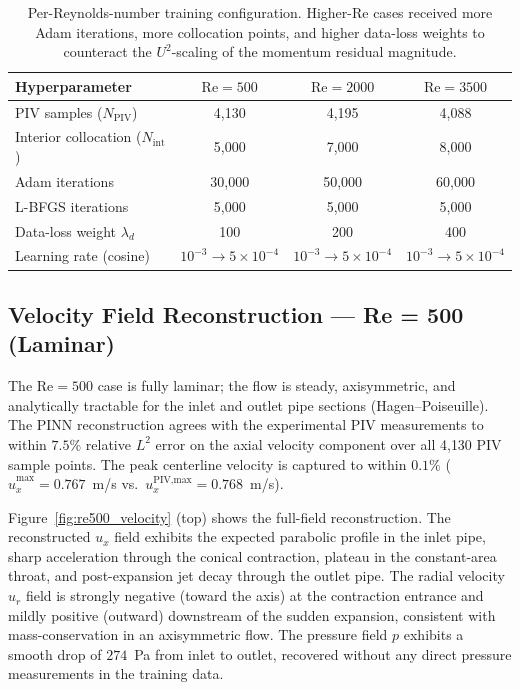 \documentclass[12pt,a4paper]{article}
\newcommand{\Reyn}{\mathrm{Re}}    %
\begin{document}
\begin{table}[H]
  \centering
  \caption{Per-Reynolds-number training configuration. Higher-$\Reyn$
  cases received more Adam iterations, more collocation points, and
  higher data-loss weights to counteract the $U^2$-scaling of the
  momentum residual magnitude.}
  \label{tab:hyperparams}
  \begin{tabular}{lccc}
    \toprule
    Hyperparameter & $\Reyn = 500$ & $\Reyn = 2000$ & $\Reyn = 3500$ \\
    \midrule
    PIV samples ($N_{\text{PIV}}$)       & 4,130  & 4,195  & 4,088  \\
    Interior collocation ($N_{\text{int}}$) & 5,000 & 7,000 & 8,000 \\
    Adam iterations                      & 30,000 & 50,000 & 60,000 \\
    L-BFGS iterations                    & 5,000  & 5,000  & 5,000  \\
    Data-loss weight $\lambda_d$         & 100    & 200    & 400    \\
    Learning rate (cosine)               & $10^{-3} \to 5\!\times\!10^{-4}$
                                         & $10^{-3} \to 5\!\times\!10^{-4}$
                                         & $10^{-3} \to 5\!\times\!10^{-4}$ \\
    \bottomrule
  \end{tabular}
\end{table}

\subsection{Velocity Field Reconstruction — Re = 500 (Laminar)}
\label{sec:results_re500}

The $\Reyn = 500$ case is fully laminar; the flow is steady,
axisymmetric, and analytically tractable for the inlet and outlet
pipe sections (Hagen--Poiseuille). The PINN reconstruction agrees
with the experimental PIV measurements to within $7.5\%$ relative
$L^2$ error on the axial velocity component over all 4{,}130 PIV
sample points. The peak centerline velocity is captured to within
$0.1\%$ ($\hat{u}_x^{\max} = 0.767$~m/s vs.\ $u_x^{\text{PIV,max}} =
0.768$~m/s).

Figure~\ref{fig:re500_velocity} (top) shows the full-field
reconstruction. The reconstructed $u_x$ field exhibits the expected
parabolic profile in the inlet pipe, sharp acceleration through the
conical contraction, plateau in the constant-area throat, and
post-expansion jet decay through the outlet pipe. The radial
velocity $u_r$ field is strongly negative (toward the axis) at the
contraction entrance and mildly positive (outward) downstream of
the sudden expansion, consistent with mass-conservation in an
axisymmetric flow. The pressure field $p$ exhibits a smooth drop
of $274$~Pa from inlet to outlet, recovered without any direct
pressure measurements in the training data.
\end{document}
